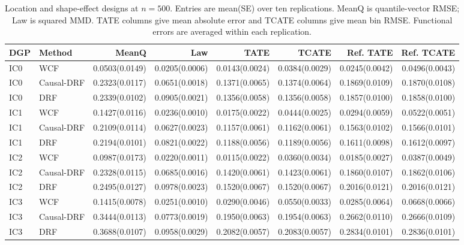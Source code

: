 \begin{table}[t]
\centering
\scriptsize
\setlength{\tabcolsep}{3pt}
\caption{Location and shape-effect designs at $n=500$. Entries are mean(SE) over ten replications. MeanQ is quantile-vector RMSE; Law is squared MMD. TATE columns give mean absolute error and TCATE columns give mean bin RMSE. Functional errors are averaged within each replication.}
\label{tab:revision-income-500}
\begin{tabular}{llrrrrrr}
\toprule
DGP & Method & MeanQ & Law & TATE & TCATE & Ref. TATE & Ref. TCATE \\
\midrule
IC0 & WCF & 0.0503(0.0149) & 0.0205(0.0006) & 0.0143(0.0024) & 0.0384(0.0029) & 0.0245(0.0042) & 0.0496(0.0043) \\
IC0 & Causal-DRF & 0.2323(0.0117) & 0.0651(0.0018) & 0.1371(0.0065) & 0.1374(0.0064) & 0.1869(0.0109) & 0.1870(0.0108) \\
IC0 & DRF & 0.2339(0.0102) & 0.0905(0.0021) & 0.1356(0.0058) & 0.1356(0.0058) & 0.1857(0.0100) & 0.1858(0.0100) \\
IC1 & WCF & 0.1427(0.0116) & 0.0236(0.0010) & 0.0175(0.0022) & 0.0444(0.0025) & 0.0294(0.0059) & 0.0522(0.0051) \\
IC1 & Causal-DRF & 0.2109(0.0114) & 0.0627(0.0023) & 0.1157(0.0061) & 0.1162(0.0061) & 0.1563(0.0102) & 0.1566(0.0101) \\
IC1 & DRF & 0.2194(0.0101) & 0.0821(0.0022) & 0.1188(0.0056) & 0.1189(0.0056) & 0.1611(0.0098) & 0.1612(0.0097) \\
IC2 & WCF & 0.0987(0.0173) & 0.0220(0.0011) & 0.0115(0.0022) & 0.0360(0.0034) & 0.0185(0.0027) & 0.0387(0.0049) \\
IC2 & Causal-DRF & 0.2328(0.0115) & 0.0685(0.0016) & 0.1420(0.0061) & 0.1423(0.0061) & 0.1860(0.0107) & 0.1862(0.0106) \\
IC2 & DRF & 0.2495(0.0127) & 0.0978(0.0023) & 0.1520(0.0067) & 0.1520(0.0067) & 0.2016(0.0121) & 0.2016(0.0121) \\
IC3 & WCF & 0.1415(0.0078) & 0.0251(0.0010) & 0.0290(0.0046) & 0.0550(0.0033) & 0.0285(0.0064) & 0.0668(0.0066) \\
IC3 & Causal-DRF & 0.3444(0.0113) & 0.0773(0.0019) & 0.1950(0.0063) & 0.1954(0.0063) & 0.2662(0.0110) & 0.2666(0.0109) \\
IC3 & DRF & 0.3688(0.0107) & 0.0958(0.0029) & 0.2082(0.0057) & 0.2083(0.0057) & 0.2834(0.0101) & 0.2836(0.0101) \\
\bottomrule
\end{tabular}
\end{table}
